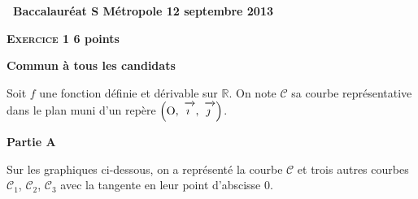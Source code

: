 \documentclass[10pt]{article}
\newcommand{\R}{\mathbb{R}}
\newcommand{\vect}[1]{\mathchoice%
{\overrightarrow{\displaystyle\mathstrut#1\,\,}}%
{\overrightarrow{\textstyle\mathstrut#1\,\,}}%
{\overrightarrow{\scriptstyle\mathstrut#1\,\,}}%
{\overrightarrow{\scriptscriptstyle\mathstrut#1\,\,}}}
\def\Oij{$\left(\text{O},~\vect{\imath},~\vect{\jmath}\right)$}
\begin{document}
\pagestyle{fancy}
\thispagestyle{empty}
\begin{center}

{\Large \textbf{\decofourleft~Baccalauréat S  Métropole 12 septembre 2013~\decofourright}}

 \end{center}

\vspace{0,25cm}

\textbf{\textsc{Exercice 1} \hfill 6 points}
 
\textbf{Commun à tous les candidats}

\medskip

Soit $f$ une fonction définie et dérivable sur $\R$. On note $\mathcal{C}$ sa courbe représentative dans le plan muni d'un repère \Oij.

\medskip
 
\textbf{Partie A}

\medskip
 
Sur les graphiques ci-dessous, on a représenté la courbe $\mathcal{C}$ et trois autres courbes $\mathcal{C}_{1}$, $\mathcal{C}_{2}$, $\mathcal{C}_{3}$ avec la tangente en leur point d'abscisse $0$. 
\end{document}
